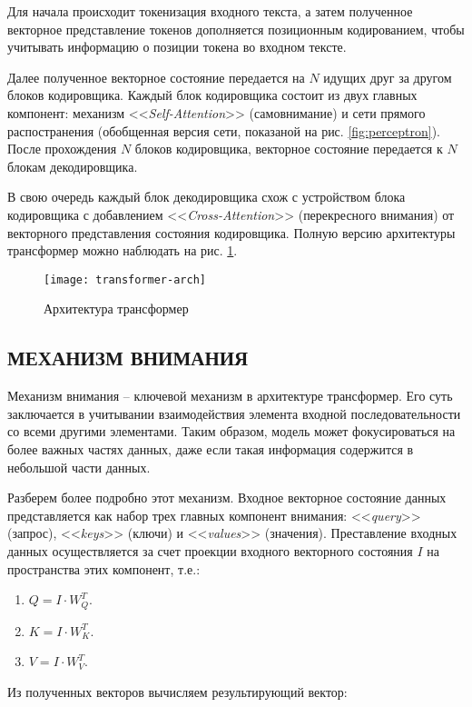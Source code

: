 Для начала происходит токенизация входного текста, а затем полученное векторное представление токенов дополняется позиционным кодированием, чтобы учитывать информацию о позиции токена во входном тексте.

Далее полученное векторное состояние передается на $N$ идущих друг за другом блоков кодировщика. Каждый блок кодировщика состоит из двух главных компонент: механизм <<\textit{Self-Attention}>> (самовнимание) и сети прямого распостранения (обобщенная версия сети, показаной на рис. \ref{fig:perceptron}). После прохождения $N$ блоков кодировщика, векторное состояние передается к $N$ блокам декодировщика.

В свою очередь каждый блок декодировщика схож с устройством блока кодировщика с добавлением <<\textit{Cross-Attention}>> (перекресного внимания) от векторного представления состояния кодировщика. Полную версию архитектуры трансформер можно наблюдать на рис. \ref{fig:transformer-arch}.
\begin{figure}[H]
    \centering
    \texttt{[image: transformer-arch]}
    \caption{Архитектура трансформер}
    \label{fig:transformer-arch}
\end{figure}
\subsection{МЕХАНИЗМ ВНИМАНИЯ}
Механизм внимания -- ключевой механизм в архитектуре трансформер. Его суть заключается в учитывании взаимодействия элемента входной последовательности со всеми другими элементами. Таким образом, модель может фокусироваться на более важных частях данных, даже если такая информация содержится в небольшой части данных.

Разберем более подробно этот механизм. Входное векторное состояние данных представляется как набор трех главных компонент внимания: <<\textit{query}>> (запрос), <<\textit{keys}>> (ключи) и <<\textit{values}>> (значения). Преставление входных данных осуществляется за счет проекции входного векторного состояния $I$ на пространства этих компонент, т.е.:

\begin{enumerate}
    \item $Q = I \cdot W_Q^T$.
    \item $K = I \cdot W_K^T$.
    \item $V = I \cdot W_V^T$.
\end{enumerate}

Из полученных векторов вычисляем результирующий вектор:

